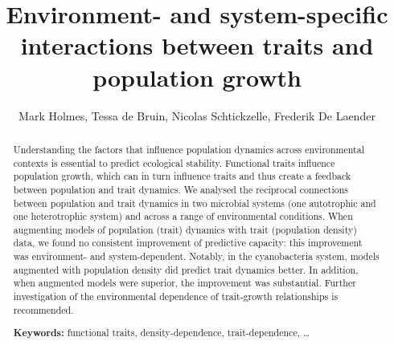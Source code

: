\title{Environment- and system-specific interactions between traits and population growth}
\author{Mark Holmes, Tessa de Bruin, Nicolas Schtickzelle, Frederik De Laender}

\maketitle

\begin{abstract}

Understanding the factors that influence population dynamics across environmental contexts is essential to predict ecological stability. Functional traits influence population growth, which can in turn influence traits and thus create a feedback between population and trait dynamics. We analysed the reciprocal connections between population and trait dynamics in two microbial systems (one autotrophic and one heterotrophic system) and across a range of environmental conditions. When augmenting models of population (trait) dynamics with trait (population density) data, we found no consistent improvement of predictive capacity: this improvement was environment- and system-dependent. Notably, in the cyanobacteria system, models augmented with population density did predict trait dynamics better. In addition, when augmented models were superior, the improvement was substantial. Further investigation of the environmental dependence of trait-growth relationships is recommended.

\textbf{Keywords:} functional traits, density-dependence, trait-dependence, \dots

\end{abstract}

